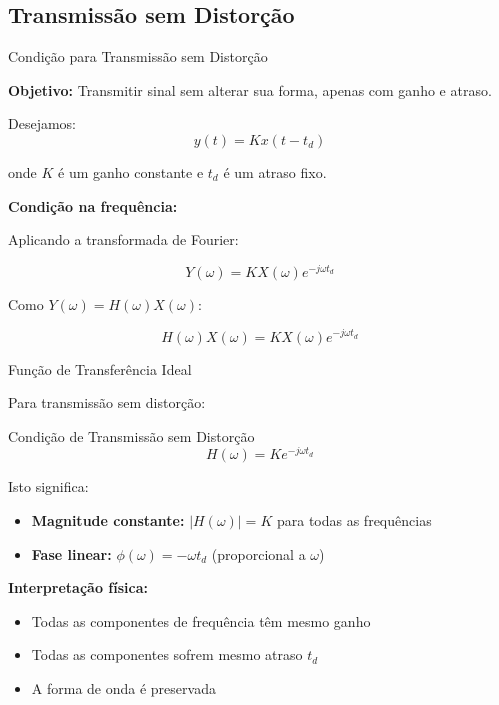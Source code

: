
\subsection{Transmissão sem Distorção}

\begin{frame}{Condição para Transmissão sem Distorção}

\textbf{Objetivo:} Transmitir sinal sem alterar sua forma, apenas com ganho e atraso.

Desejamos:
\[
y(t) = K x(t - t_d)
\]

onde $K$ é um ganho constante e $t_d$ é um atraso fixo.

\vspace{0.1cm}

\textbf{Condição na frequência:}

Aplicando a transformada de Fourier:

\[
Y(\omega) = K X(\omega) e^{-j\omega t_d}
\]

Como $Y(\omega) = H(\omega)X(\omega)$:

\[
H(\omega)X(\omega) = K X(\omega) e^{-j\omega t_d}
\]

\end{frame}


\begin{frame}{Função de Transferência Ideal}

Para transmissão sem distorção:

\begin{block}{Condição de Transmissão sem Distorção}
\[
\boxed{H(\omega) = K e^{-j\omega t_d}}
\]
\end{block}

Isto significa:
\begin{itemize}
\item \textbf{Magnitude constante:} $|H(\omega)| = K$ para todas as frequências
\item \textbf{Fase linear:} $\phi(\omega) = -\omega t_d$ (proporcional a $\omega$)
\end{itemize}

\textbf{Interpretação física:}
\begin{itemize}
\item Todas as componentes de frequência têm mesmo ganho
\item Todas as componentes sofrem mesmo atraso $t_d$
\item A forma de onda é preservada
\end{itemize}

\end{frame}

